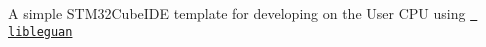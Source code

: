 A simple STM32\+Cube\+IDE template for developing on the User CPU using \href{https://gitlab.ti.bfh.ch/leguan/libleguan}{\texttt{ libleguan}} 
